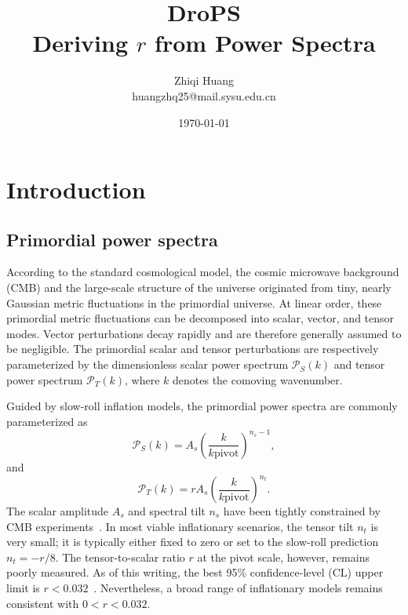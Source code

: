 \documentclass[12pt, a4paper]{ctexart} %
\begin{document}
\thispagestyle{empty}
\title{\Huge \textbf{DroPS}  \\ \huge {\color{blue}D}eriving {\color{blue} $r$} fr{\color{blue}o}m {\color{blue}P}ower {\color{blue}S}pectra}
\author{Zhiqi Huang \\
huangzhq25@mail.sysu.edu.cn}
\date{\today} %
\maketitle %

\thispagestyle{empty} %
\newpage

\tableofcontents
\newpage %

\section{Introduction}


\subsection{Primordial power spectra}
According to the standard cosmological model, the cosmic microwave background (CMB) and the large-scale structure of the universe originated from tiny, nearly Gaussian metric fluctuations in the primordial universe. At linear order, these primordial metric fluctuations can be decomposed into scalar, vector, and tensor modes. Vector perturbations decay rapidly and are therefore generally assumed to be negligible. The primordial scalar and tensor perturbations are respectively parameterized by the dimensionless scalar power spectrum $\mathcal{P}_S(k)$ and tensor power spectrum $\mathcal{P}_T(k)$, where $k$ denotes the comoving wavenumber.

Guided by slow-roll inflation models, the primordial power spectra are commonly parameterized as
\begin{equation}
\mathcal{P}_S(k) = A_s \left(\frac{k}{k{\mathrm{pivot}}}\right)^{n_s - 1},
\end{equation}
and
\begin{equation}
\mathcal{P}_T(k) = r A_s \left(\frac{k}{k{\mathrm{pivot}}}\right)^{n_t}.
\end{equation}
The scalar amplitude $A_s$ and spectral tilt $n_s$ have been tightly constrained by CMB experiments~\cite{Planck18Params}. In most viable inflationary scenarios, the tensor tilt $n_t$ is very small; it is typically either fixed to zero or set to the slow-roll prediction $n_t = -r/8$. The tensor-to-scalar ratio $r$ at the pivot scale, however, remains poorly measured. As of this writing, the best 95\% confidence-level (CL) upper limit is $r < 0.032$~\cite{Tristram22}. Nevertheless, a broad range of inflationary models remains consistent with $0 < r < 0.032$.  
\end{document}

